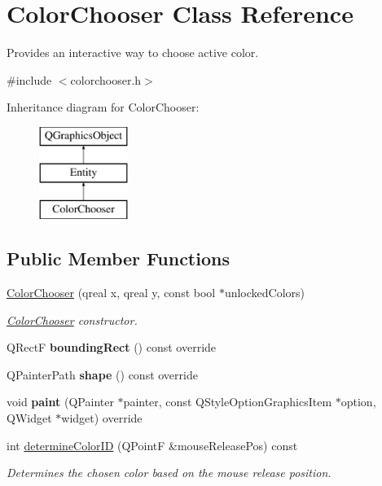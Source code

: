 \hypertarget{class_color_chooser}{}\section{Color\+Chooser Class Reference}
\label{class_color_chooser}


Provides an interactive way to choose active color.  




{\ttfamily \#include $<$colorchooser.\+h$>$}

Inheritance diagram for Color\+Chooser\+:\begin{figure}[H]
\begin{center}
\leavevmode
\includegraphics[height=3.000000cm]{class_color_chooser}
\end{center}
\end{figure}
\subsection*{Public Member Functions}
\begin{DoxyCompactItemize}
\item 
\hyperlink{class_color_chooser_ab12d2e0cc21b24e781898fd0a65efad6}{Color\+Chooser} (qreal x, qreal y, const bool $\ast$unlocked\+Colors)
\begin{DoxyCompactList}\small\item\em \hyperlink{class_color_chooser}{Color\+Chooser} constructor. \end{DoxyCompactList}\item 
\mbox{\label{class_color_chooser_a90328954c0861ae766dd970bb249a5d4}} 
Q\+RectF {\bfseries bounding\+Rect} () const override
\item 
\mbox{\label{class_color_chooser_ae3f5854042dfc35672b07fe66acd3a28}} 
Q\+Painter\+Path {\bfseries shape} () const override
\item 
\mbox{\label{class_color_chooser_aa742a2887a5f3e07218e96d82dfc8e5f}} 
void {\bfseries paint} (Q\+Painter $\ast$painter, const Q\+Style\+Option\+Graphics\+Item $\ast$option, Q\+Widget $\ast$widget) override
\item 
int \hyperlink{class_color_chooser_a20c2a870029438ab2300ad2d4c12d21c}{determine\+Color\+ID} (Q\+PointF \&mouse\+Release\+Pos) const
\begin{DoxyCompactList}\small\item\em Determines the chosen color based on the mouse release position. \end{DoxyCompactList}\end{DoxyCompactItemize}
